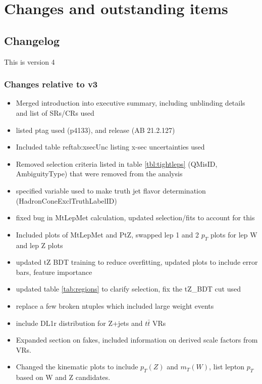 \documentclass[NOTE, atlasdraft=true, texlive=2016, UKenglish]{\ATLASLATEXPATH atlasdoc}
\begin{document}
\maketitle

\tableofcontents

\clearpage

\section{Changes and outstanding items}
\label{sec:changes}

\subsection{Changelog}

This is version 4

\subsubsection{Changes relative to v3}
\begin{itemize}
  \item Merged introduction into executive summary, including unblinding details and list of SRs/CRs used
  \item listed ptag used (p4133), and release (AB 21.2.127)
  \item Included table ref{tab:xsecUnc} listing x-sec uncertainties used
  \item Removed selection criteria listed in table \ref{tbl:tightleps} (QMisID, AmbiguityType) that were removed from the analysis
  \item specified variable used to make truth jet flavor determination (HadronConeExclTruthLabelID)
  \item fixed bug in MtLepMet calculation, updated selection/fits to account for this
  \item Included plots of MtLepMet and PtZ, swapped lep 1 and 2 $p_T$ plots for lep W and lep Z plots
  \item updated tZ BDT training to reduce overfitting, updated plots to include error bars, feature importance
  \item updated table \ref{tab:regions} to clarify selection, fix the tZ\_BDT cut used
  \item replace a few broken ntuples which included large weight events
  \item include DL1r distribution for Z+jets and $t\bar{t}$ VRs
  \item Expanded section on fakes, included information on derived scale factors from VRs.
  \item Changed the kinematic plots to include $p_T(Z)$ and $m_T(W)$, list lepton $p_T$ based on W and Z candidates.
\end{itemize}
\end{document}
